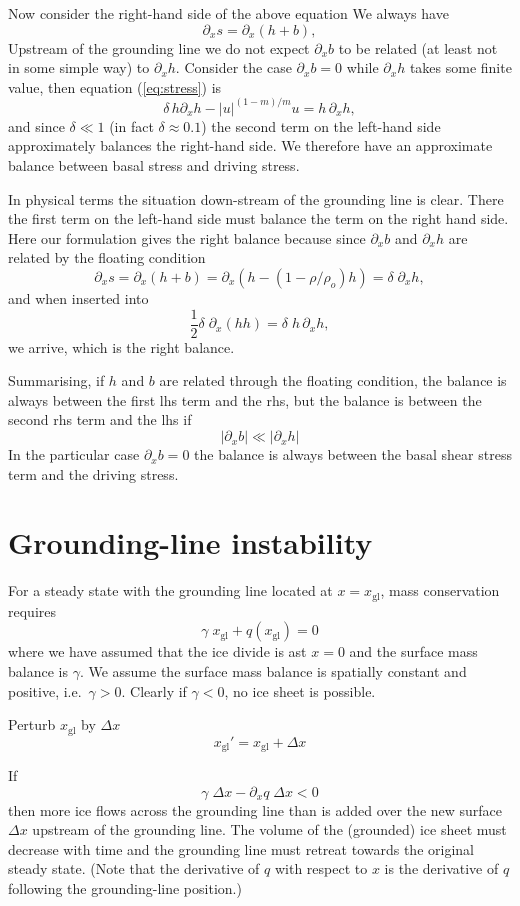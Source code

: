 \documentclass[10pt,a4paper]{book}
\newcommand{\p}{\partial}
\newcommand{\xgl}{x_{\mathrm{gl}}}
\begin{document}
Now consider the right-hand side of the above equation
We always have
\[ 
\p_x s= \p_x (h+b) ,
\]
Upstream of the grounding line we do not expect $\p_x b$ to be related
(at least not in some simple way) to $\p_x h$. Consider the case
$\p_x b=0$ while $\p_x h$ takes some finite value, then
equation (\ref{eq:stress}) is
\begin{equation}
\delta \, h \p_x h  - |u|^{(1-m)/m} u  = h \, \p_x h  ,
\label{eq:sc4}
\end{equation}
and since $\delta \ll 1$ (in fact $\delta \approx 0.1$) the second
term on the left-hand side approximately balances the right-hand
side. We therefore have an approximate balance between basal stress
and driving stress.

In physical terms the situation down-stream of the grounding line is clear. There the
first term on the left-hand side must balance the term on the right
hand side. Here our formulation gives the right balance because since  $\p_x
b$ and $\p_x h$ are related by the floating condition
\[
\p_x s= \p_x(h+b)=\p_x (h-(1-\rho/\rho_o) h)=\delta \; \p_x h ,
\]
and when inserted into 
\begin{equation}
 \frac{1}{2} \delta \; \p_x \left (h h \right )  = \delta \; h \, \p_x h  ,
\label{eq:sc40}
\end{equation}
we arrive, which is the right balance.

Summarising, if $h$ and $b$ are related
through the floating condition, the balance is always between the
first lhs term and the rhs, but  the balance is between the second rhs
term and the lhs if
\[
|\p_x b| \ll |\p_x h|
\] 
In the particular case $\p_x b=0$ the balance is always
between the basal shear stress term and the driving stress.


\section{Grounding-line instability}

For a steady state with the grounding line located at $x=\xgl$, mass
conservation requires
\[
\gamma \; \xgl + q(\xgl)=0
\]
where we have assumed that the ice divide is ast $x=0$ and the surface
mass balance is $\gamma$. We assume the surface mass balance is spatially constant and
positive, i.e.\ $\gamma > 0$. Clearly if $\gamma<0$, no ice sheet is possible. 

Perturb $\xgl$ by $\Delta x$
\[
  \xgl'=\xgl + \Delta x
\]

If
\[
\gamma \; \Delta x - \p_x q \; \Delta x < 0
\]
then more ice flows across the grounding line than is added over the
new surface $\Delta x$ upstream of the grounding line. The volume of
the (grounded) ice sheet must decrease with time and the grounding
line must retreat towards the original steady state. (Note that the
derivative of $q$ with respect to $x$ is the derivative of $q$
following the grounding-line position.)
\end{document}
